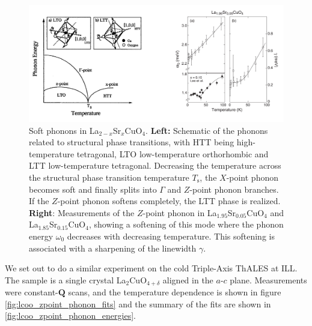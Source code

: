 \begin{figure}[]
    \centering
    \includegraphics[width=\textwidth]{fig/lowen/soft_phonons.png}
    \caption{Soft phonons in La$_{2-x}$Sr$_x$CuO$_4$. \textbf{Left:} Schematic of the phonons related to structural phase transitions, with HTT being high-temperature tetragonal, LTO low-temperature orthorhombic and LTT low-temperature tetragonal. Decreasing the temperature across the structural phase transition temperature $T_\text{s}$, the $X$-point phonon becomes soft and finally splits into $\Gamma$ and $Z$-point phonon branches. If the $Z$-point phonon softens completely, the LTT phase is realized. \textbf{Right}: Measurements of the $Z$-point phonon in La$_{1.95}$Sr$_{0.05}$CuO$_4$ and La$_{1.85}$Sr$_{0.15}$CuO$_4$, showing a softening of this mode where the phonon energy $\omega_0$ decreases with decreasing temperature. This softening is associated with a sharpening of the linewidth $\gamma$.}
    \label{fig:soft_phonons_summary}
\end{figure}

We set out to do a similar experiment on the cold Triple-Axis ThALES at ILL. The sample is a single crystal La$_2$CuO$_{4+\delta}$ aligned in the $a$-$c$ plane. Measurements were constant-$\bm{Q}$ scans, and the temperature dependence is shown in figure \ref{fig:lcoo_zpoint_phonon_fits} and the summary of the fits are shown in \ref{fig:lcoo_zpoint_phonon_energies}.

